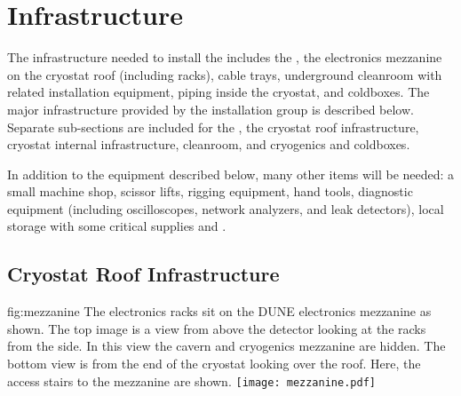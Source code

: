 \section{Infrastructure}
\label{sec:fdsp-tc-infr}



The infrastructure needed to install the  includes the , the electronics mezzanine on the cryostat roof (including racks), cable trays, underground cleanroom with related installation equipment, piping inside the cryostat, and coldboxes. 
 The major infrastructure provided by the installation group is described below. 
 Separate sub-sections are included for the , the cryostat roof infrastructure, cryostat internal infrastructure, cleanroom, and cryogenics and coldboxes.

In addition to the equipment described below, many other items will be needed: a small machine shop, scissor lifts, rigging equipment, hand tools, diagnostic equipment (including oscilloscopes, network analyzers, and leak detectors), local storage with some critical supplies and .  





\subsection{Cryostat Roof Infrastructure}
\label{sec:fdsp-tc-infr-cryo-roof}



\begin{dunefigure}{fig:mezzanine}
  {The electronics racks sit on the DUNE electronics mezzanine as shown. The top image is a view from above the detector looking at the racks from the side. In this view the cavern and cryogenics mezzanine are hidden. The bottom view is from the end of the cryostat looking over the roof. Here, the access stairs to the mezzanine are shown.}
 \texttt{[image: mezzanine.pdf]}
\end{dunefigure}

